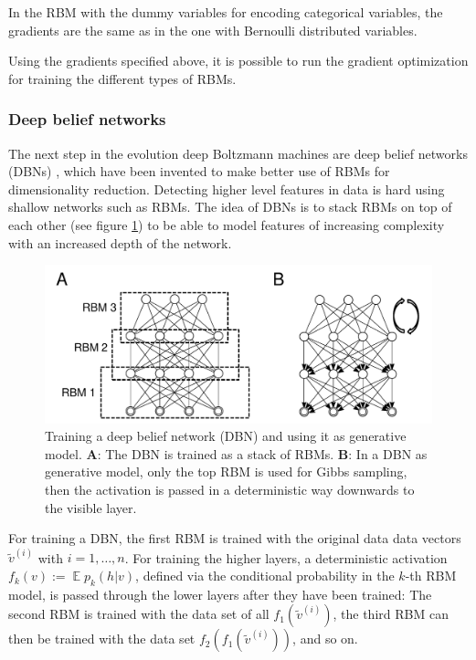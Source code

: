 \documentclass[12pt]{article}
\DeclareMathOperator{\EX}{\mathbb{E}}
\begin{document}
In the RBM with the dummy variables for encoding categorical variables, the gradients are the same as in the one with Bernoulli distributed variables.

Using the gradients specified above, it is possible to run the gradient optimization for training the different types of RBMs.

\subsubsection{Deep belief networks}\label{dbns}

The next step in the evolution deep Boltzmann machines are deep belief networks (DBNs) \citep{hinton_reducing_2006}, which have been invented to make better use of RBMs for dimensionality reduction.
Detecting higher level features in data is hard using shallow networks such as RBMs.
The idea of DBNs is to stack RBMs on top of each other (see figure \ref{fig:dbn}) to be able to model features of increasing complexity with an increased depth of the network.

\begin{figure}[h]
   \centering
   \includegraphics[scale=0.7]{images/dbn.pdf}
   \caption{Training a deep belief network (DBN) and using it as generative model.
   {\bf A}: The DBN is trained as a stack of RBMs. {\bf B}: In a DBN as generative model, only the top RBM is used for Gibbs sampling, then the activation is passed in a deterministic way downwards to the visible layer.}
   \label{fig:dbn}
 \end{figure}
 
For training a DBN, the first RBM is trained with the original data data vectors $\tilde{v}^{(i)}$ with $i = 1, \dots, n$. 
For training the higher layers, a deterministic activation $f_k(v) :=  \EX p_k(h|v)$, defined via the conditional probability in the $k$-th RBM model, is passed through the lower layers after they have been trained:
The second RBM is trained with the data set of all $f_1(\tilde{v}^{(i)})$, the third RBM can then be trained with the data set $f_2(f_1(\tilde{v}^{(i)}))$, and so on.
\end{document}
